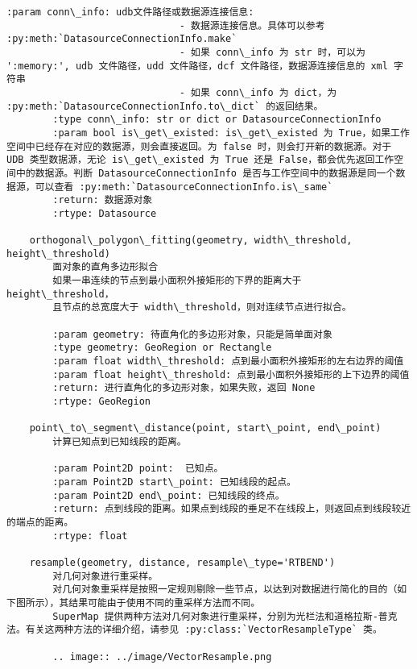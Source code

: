 \documentclass[11pt]{article}
\begin{document}
\begin{Verbatim}[commandchars=\\\{\}]
        :param conn\_info: udb文件路径或数据源连接信息:
                              - 数据源连接信息。具体可以参考 :py:meth:`DatasourceConnectionInfo.make`
                              - 如果 conn\_info 为 str 时，可以为 ':memory:', udb 文件路径，udd 文件路径，dcf 文件路径，数据源连接信息的 xml 字符串
                              - 如果 conn\_info 为 dict，为  :py:meth:`DatasourceConnectionInfo.to\_dict` 的返回结果。
        :type conn\_info: str or dict or DatasourceConnectionInfo
        :param bool is\_get\_existed: is\_get\_existed 为 True，如果工作空间中已经存在对应的数据源，则会直接返回。为 false 时，则会打开新的数据源。对于 UDB 类型数据源，无论 is\_get\_existed 为 True 还是 False，都会优先返回工作空间中的数据源。判断 DatasourceConnectionInfo 是否与工作空间中的数据源是同一个数据源，可以查看 :py:meth:`DatasourceConnectionInfo.is\_same`
        :return: 数据源对象
        :rtype: Datasource
    
    orthogonal\_polygon\_fitting(geometry, width\_threshold, height\_threshold)
        面对象的直角多边形拟合
        如果一串连续的节点到最小面积外接矩形的下界的距离大于 height\_threshold，
        且节点的总宽度大于 width\_threshold，则对连续节点进行拟合。
        
        :param geometry: 待直角化的多边形对象，只能是简单面对象
        :type geometry: GeoRegion or Rectangle
        :param float width\_threshold: 点到最小面积外接矩形的左右边界的阈值
        :param float height\_threshold: 点到最小面积外接矩形的上下边界的阈值
        :return: 进行直角化的多边形对象，如果失败，返回 None
        :rtype: GeoRegion
    
    point\_to\_segment\_distance(point, start\_point, end\_point)
        计算已知点到已知线段的距离。
        
        :param Point2D point:  已知点。
        :param Point2D start\_point: 已知线段的起点。
        :param Point2D end\_point: 已知线段的终点。
        :return: 点到线段的距离。如果点到线段的垂足不在线段上，则返回点到线段较近的端点的距离。
        :rtype: float
    
    resample(geometry, distance, resample\_type='RTBEND')
        对几何对象进行重采样。
        对几何对象重采样是按照一定规则剔除一些节点，以达到对数据进行简化的目的（如下图所示），其结果可能由于使用不同的重采样方法而不同。
        SuperMap 提供两种方法对几何对象进行重采样，分别为光栏法和道格拉斯-普克法。有关这两种方法的详细介绍，请参见 :py:class:`VectorResampleType` 类。
        
        .. image:: ../image/VectorResample.png
        

\end{Verbatim}
\end{document}
